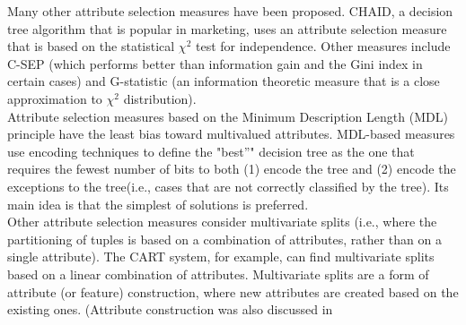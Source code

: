 Many other attribute selection measures have been proposed. CHAID, a decision tree algorithm that is popular
in marketing, uses an attribute selection measure that is based on the statistical $\chi^{2} $ test for independence. Other measures include C-SEP (which performs better than information gain and the Gini index in certain cases) and
G-statistic (an information theoretic measure that is a close approximation to $\chi^{2} $ distribution).\\
Attribute selection measures based on the Minimum Description Length (MDL) principle have the least bias
toward multivalued attributes. MDL-based measures use encoding techniques to define the "best”" decision tree
as the one that requires the fewest number of bits to both (1) encode the tree and (2) encode the exceptions to
the tree(i.e., cases that are not correctly classified by the tree). Its main idea is that the simplest of solutions is preferred. \\
Other attribute selection measures consider multivariate splits (i.e., where the partitioning of tuples is based
on a combination of attributes, rather than on a single attribute). The CART system, for example, can find
multivariate splits based on a linear combination of attributes. Multivariate splits are a form of attribute (or
feature) construction, where new attributes are created based on the existing ones. (Attribute construction was
also discussed in
